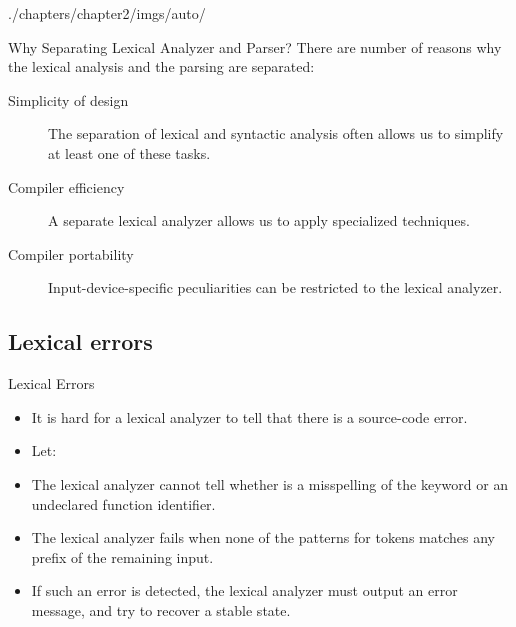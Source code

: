 \begin{graphicspathcontext}{{./chapters/chapter2/imgs/auto/}}
\begin{bibunit}[apalike]
\begin{frame}{Why Separating Lexical Analyzer and Parser?}
	There are number of reasons why the lexical analysis and the parsing are separated:
	\begin{description}
	\item[Simplicity of design] The separation of lexical and syntactic analysis often allows us to simplify at least one of these tasks.
	\vfill
	\item[Compiler efficiency] A separate lexical analyzer allows us to apply specialized techniques.
	\vfill
	\item[Compiler portability] Input-device-specific peculiarities can be restricted to the lexical analyzer.
	\end{description}
\end{frame}

\subsection{Lexical errors}
\begin{frame}{Lexical Errors}
	\begin{itemize}
	\item It is hard for a lexical analyzer to tell that there is a source-code error.
	\vfill
	\item Let: 
	\vfill
	\item The lexical analyzer cannot tell whether  is a misspelling of the keyword  or an undeclared function identifier.
	\vfill
	\item The lexical analyzer fails when none of the patterns for tokens matches any prefix of the remaining input.
	\vfill
	\item If such an error is detected, the lexical analyzer must output an error message, and try to recover a stable state.
	\end{itemize}
\end{frame}


\end{bibunit}
\end{graphicspathcontext}
